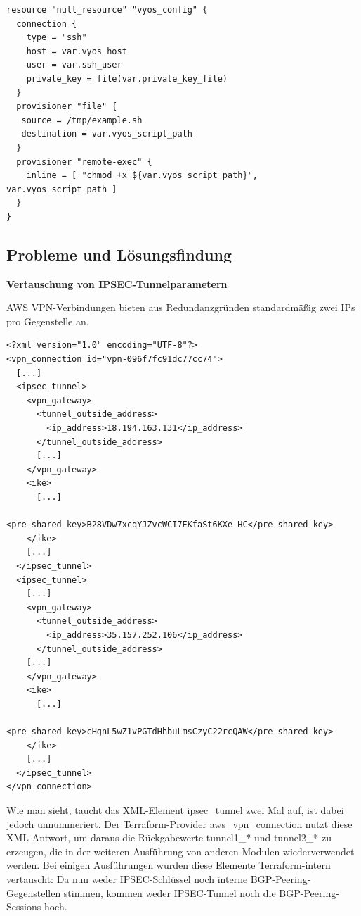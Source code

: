 \begin{lstlisting}[label=tf-generate-psk,caption=Das so generierte Shell-Skript wird per SSH auf das Zielsystem (VyOS-Router) hochgeladen und per provisioner remote-exec ausgeführt.]
resource "null_resource" "vyos_config" {
  connection {
    type = "ssh"
    host = var.vyos_host
    user = var.ssh_user
    private_key = file(var.private_key_file)
  }
  provisioner "file" {
   source = /tmp/example.sh
   destination = var.vyos_script_path
  }
  provisioner "remote-exec" {
    inline = [ "chmod +x ${var.vyos_script_path}", var.vyos_script_path ]
  }
}
\end{lstlisting}

\newpage
\subsection{Probleme und Lösungsfindung}

\textbf{\underline{Vertauschung von IPSEC-Tunnelparametern}}

AWS VPN-Verbindungen bieten aus Redundanzgründen standardmäßig zwei IPs pro Gegenstelle an. 

\begin{lstlisting}[label=tf-xml-response-aws,caption=Die ursprüngliche (gekürzte) XML-Antwort der AWS API.]
<?xml version="1.0" encoding="UTF-8"?>
<vpn_connection id="vpn-096f7fc91dc77cc74">
  [...]
  <ipsec_tunnel>
    <vpn_gateway>
      <tunnel_outside_address>
        <ip_address>18.194.163.131</ip_address>
      </tunnel_outside_address>
      [...]
    </vpn_gateway>
    <ike>
      [...]
      <pre_shared_key>B28VDw7xcqYJZvcWCI7EKfaSt6KXe_HC</pre_shared_key>
    </ike>
    [...]
  </ipsec_tunnel>
  <ipsec_tunnel>
    [...]
    <vpn_gateway>
      <tunnel_outside_address>
        <ip_address>35.157.252.106</ip_address>
      </tunnel_outside_address>
    [...]
    </vpn_gateway>
    <ike>
      [...]
      <pre_shared_key>cHgnL5wZ1vPGTdHhbuLmsCzyC22rcQAW</pre_shared_key>
    </ike>
    [...]
  </ipsec_tunnel>
</vpn_connection>

\end{lstlisting}

Wie man sieht, taucht das XML-Element ipsec\_tunnel zwei Mal auf, ist dabei jedoch unnummeriert.
Der Terraform-Provider aws\_vpn\_connection nutzt diese XML-Antwort, um daraus die Rückgabewerte tunnel1\_* und tunnel2\_* zu erzeugen, die in der weiteren Ausführung von anderen Modulen wiederverwendet werden. Bei einigen Ausführungen wurden diese Elemente Terraform-intern vertauscht: Da nun weder IPSEC-Schlüssel noch interne BGP-Peering-Gegenstellen stimmen, kommen weder IPSEC-Tunnel noch die BGP-Peering-Sessions hoch.

